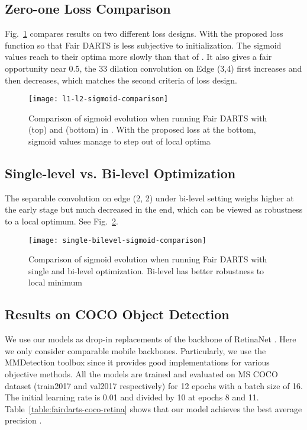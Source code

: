 \documentclass[runningheads]{llncs}
\begin{document}
\subsection{Zero-one Loss Comparison}
Fig.~\ref{fig:l1-l2-sigmoid-comparison} compares results on two different loss designs. With the proposed loss function  so that Fair DARTS is less subjective to initialization. The sigmoid values reach to their optima more slowly than that of . It also gives a fair opportunity near 0.5,  the 33 dilation convolution on Edge (3,4) first increases and then decreases, which matches the second criteria of loss design.


\begin{figure}[ht]
	\centering
	\texttt{[image: l1-l2-sigmoid-comparison]}
\caption{Comparison of sigmoid evolution when running Fair DARTS with  (top) and  (bottom) in . With the proposed loss at the bottom, sigmoid values manage to step out of local optima }
	\label{fig:l1-l2-sigmoid-comparison}
\end{figure}

\subsection{Single-level vs. Bi-level Optimization}
The  separable convolution on edge (2, 2) under bi-level setting weighs higher at the early stage but much decreased in the end, which can be viewed as robustness to a local optimum. See Fig.~\ref{fig:single-bilevel-sigmoid-comparison}. 


\begin{figure}[ht]
	\centering
	\texttt{[image: single-bilevel-sigmoid-comparison]}
\caption{Comparison of sigmoid evolution when running Fair DARTS with single and bi-level optimization. Bi-level has better robustness to local minimum}
	\label{fig:single-bilevel-sigmoid-comparison}
\end{figure}


\subsection{Results on COCO Object Detection}

We use our models as  drop-in replacements of the backbone of RetinaNet \cite{lin2017focal}. Here we only consider comparable mobile backbones. Particularly, we use the MMDetection \cite{chen2019mmdetection} toolbox since it provides good implementations for various objective methods.  All the models are trained and evaluated on MS COCO dataset (train2017 and val2017 respectively)  for 12 epochs with a batch size of 16. The initial learning rate is 0.01 and divided by 10 at epochs 8 and 11.  Table~\ref{table:fairdarts-coco-retina} shows that our model achieves the best average precision . 
\end{document}
